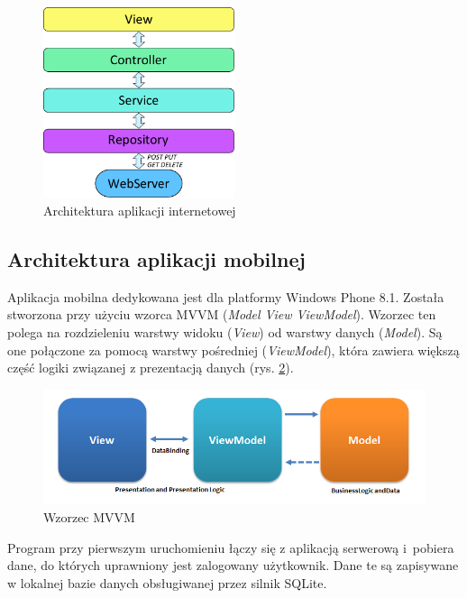 \documentclass[a4paper]{book}
\begin{document}
			\begin{figure}
				\centering
				\includegraphics[width=0.5\textwidth]{images/architektura_webapp.pdf}
				\caption{Architektura aplikacji internetowej}
				\label{fig:architektura_webapp}
    		\end{figure}		
			
			\subsection{Architektura aplikacji mobilnej}
			\label{sec:ArchitekturaAplikacjiMobilnej}	
			
			
			Aplikacja mobilna dedykowana jest dla platformy Windows Phone 8.1. Została stworzona przy użyciu wzorca MVVM (\emph{Model View ViewModel}). Wzorzec ten polega na rozdzieleniu warstwy widoku (\emph{View}) od warstwy danych (\emph{Model}). Są one połączone za pomocą warstwy pośredniej (\emph{ViewModel}), która zawiera większą część logiki związanej z prezentacją danych (rys. \ref{fig:mvvmpattern}).
			
			\begin{figure}
				\centering
				\includegraphics[width=1.0\textwidth]{images/MVVMPattern.png}
				\caption{Wzorzec MVVM \cite{id:mvvmpattern}}
				\label{fig:mvvmpattern}
			\end{figure} 
			
			Program przy pierwszym uruchomieniu łączy się z aplikacją serwerową i~pobiera dane, do których uprawniony jest zalogowany użytkownik. Dane te są zapisywane w lokalnej bazie danych obsługiwanej przez silnik SQLite. 
			
\end{document}

